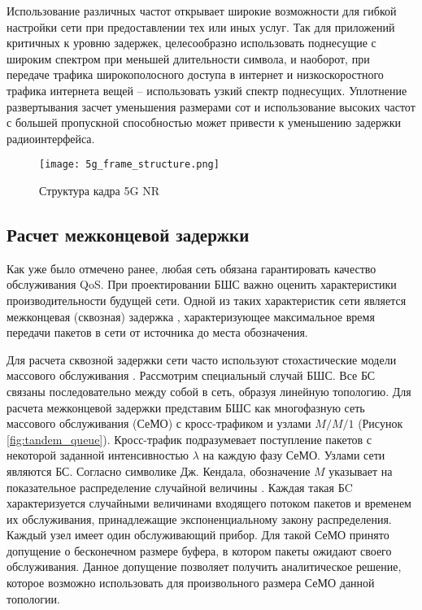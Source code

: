 Использование различных частот открывает широкие возможности для гибкой настройки сети при предоставлении тех или иных услуг. Так для приложений критичных к уровню задержек, целесообразно использовать поднесущие с широким спектром при меньшей длительности символа, и наоборот, при передаче трафика широкополосного доступа в интернет и низкоскоростного трафика интернета вещей -- использовать узкий спектр поднесущих. Уплотнение развертывания засчет уменьшения размерами сот и использование высоких частот с большей пропускной способностью может привести к уменьшению задержки радиоинтерфейса.


\begin{figure}[h!]
  \centering
   \texttt{[image: 5g\_frame\_structure.png]}
\caption{Структура кадра 5G NR}
\label{fig:part1_5g_frame_structure}
\end{figure}


\subsection{Расчет межконцевой задержки}\label{part4_e2e_delay_section}

Как уже было отмечено ранее, любая сеть обязана гарантировать качество обслуживания QoS. При проектировании БШС важно оценить характеристики производительности будущей сети. Одной из таких характеристик сети является межконцевая (сквозная) задержка \cite{Vishnevsky2016_Methods_of_performance, Wang2017, Liu2016, Chen2019, Hosni2017, Capone2019, Abbas2017, Seliem2019, Malandra2018, Kalor2018, Larionov2019, Gao2016}, характеризующее максимальное время передачи пакетов в сети от источника до места обозначения.

Для расчета сквозной задержки сети часто используют стохастические модели массового обслуживания \cite{Vishnevsky2016_Methods_of_performance, Wang2017, Liu2016, Malandra2018, Larionov2019, Gao2016}. Рассмотрим специальный случай БШС. Все БС связаны последовательно между собой в сеть, образуя линейную топологию. Для расчета межконцевой задержки представим БШС как многофазную сеть массового обслуживания (СеМО) с кросс-трафиком и узлами $M/M/1$ (Рисунок \cref{fig:tandem_queue}). Кросс-трафик подразумевает поступление пакетов с некоторой заданной интенсивностью $\lambda$ на каждую фазу СеМО. Узлами сети являются БС. Согласно символике Дж. Кендала, обозначение $M$ указывает на показательное распределение случайной величины \cite{VishnevskyBook, Kleinrock1975}. Каждая такая БC характеризуется случайными величинами входящего потоком пакетов и временем их обслуживания, принадлежащие экспоненциальному закону распределения. Каждый узел имеет один обслуживающий прибор. Для такой СеМО принято допущение о бесконечном размере буфера, в котором пакеты ожидают своего обслуживания. Данное допущение позволяет получить аналитическое решение, которое возможно использовать для произвольного размера СеМО данной топологии.

